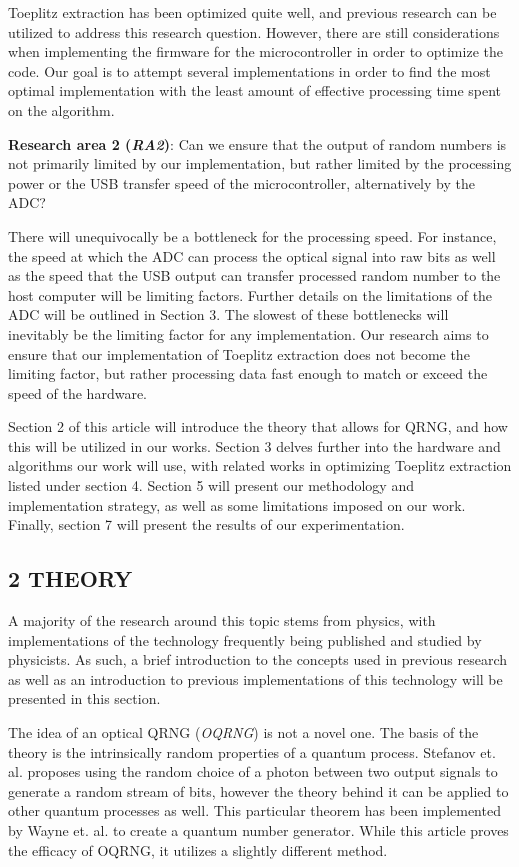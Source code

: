 \documentclass{sigchi}
\begin{document}
Toeplitz extraction has been optimized quite well, and previous research can be utilized to address this research question. However, there are still considerations when implementing the firmware for the microcontroller in order to optimize the code. Our goal is to attempt several implementations in order to find the most optimal implementation with the least amount of effective processing time spent on the algorithm.

\textbf{Research area 2 (\emph{RA2})}: Can we ensure that the output of random numbers is not primarily limited by our implementation, but rather limited by the processing power or the USB transfer speed of the microcontroller, alternatively by the ADC?

There will unequivocally be a bottleneck for the processing speed. For instance, the speed at which the ADC can process the optical signal into raw bits as well as the speed that the USB output can transfer processed random number to the host computer will be limiting factors. Further details on the limitations of the ADC will be outlined in Section 3. The slowest of these bottlenecks will inevitably be the limiting factor for any implementation. Our research aims to ensure that our implementation of Toeplitz extraction does not become the limiting factor, but rather processing data fast enough to match or exceed the speed of the hardware.

Section 2 of this article will introduce the theory that allows for QRNG, and how this will be utilized in our works. Section 3 delves further into the hardware and algorithms our work will use, with related works in optimizing Toeplitz extraction listed under section 4. Section 5 will present our methodology and implementation strategy, as well as some limitations imposed on our work. Finally, section 7 will present the results of our experimentation.

\subsection{2 THEORY}\label{theory}

A majority of the research around this topic stems from physics, with implementations of the technology frequently being published and studied by physicists. As such, a brief introduction to the concepts used in previous research as well as an introduction to previous implementations of this technology will be presented in this section.

The idea of an optical QRNG (\emph{OQRNG}) is not a novel one. The basis of the theory is the intrinsically random properties of a quantum process. Stefanov et. al. \cite{StefanovOptical} proposes using the random choice of a photon between two output signals to generate a random stream of bits, however the theory behind it can be applied to other quantum processes as well. This particular theorem has been implemented by Wayne et. al. \cite{Wayne} to create a quantum number generator. While this article proves the efficacy of OQRNG, it utilizes a slightly different method.
\end{document}
